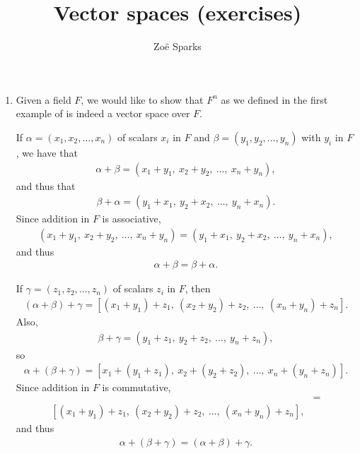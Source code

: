\documentclass[12pt]{article}
\title{Vector spaces (exercises)}
\author{Zoë Sparks}
\begin{document}
\theoremstyle{definition}

\newtheorem{thm}{Theorem}
\newtheorem*{nthm}{Theorem}
\newtheorem{sthm}{}[thm]
\newtheorem{lemma}{Lemma}[thm]
\newtheorem*{nlemma}{Lemma}
\newtheorem{cor}{Corollary}[thm]
\newtheorem*{prop}{Property}
\newtheorem*{defn}{Definition}
\newtheorem*{comm}{Comment}
\newtheorem*{exm}{Example}

\maketitle

\begin{enumerate}
  \item
    Given a field $F$, we would like to show that $F^n$ as we
    defined in the first example of  is indeed
    a vector space over $F$.

    If $\alpha = (x_1,x_2,\ldots,x_n)$ of scalars $x_i$ in $F$
    and $\beta = (y_1,y_2,\ldots,y_n)$ with $y_i$ in $F$, we have
    that
    \begin{align*}
      \alpha + \beta = (x_1+y_1,\ x_2+y_2,\ \ldots,\ x_n+y_n),
    \end{align*}
    and thus that
    \begin{align*}
      \beta + \alpha = (y_1+x_1,\ y_2+x_2,\ \ldots,\ y_n+x_n).
    \end{align*}
    Since addition in $F$ is associative,
    \begin{align*}
      (x_1+y_1,\ x_2+y_2,\ \ldots,\ x_n+y_n) = (y_1+x_1,\
      y_2+x_2,\ \ldots,\ y_n+x_n),
    \end{align*}
    and thus
    \begin{align*}
      \alpha + \beta = \beta + \alpha.
    \end{align*}

    If $\gamma = (z_1,z_2,\ldots,z_n)$ of scalars $z_i$ in $F$,
    then
    \begin{align*}
      (\alpha + \beta) + \gamma = [(x_1+y_1)+z_1,\
      (x_2+y_2)+z_2,\ \ldots,\ (x_n+y_n)+z_n].
    \end{align*}
    Also,
    \begin{align*}
      \beta + \gamma = (y_1+z_1,\ y_2+z_2,\ \ldots,\ y_n+z_n),
    \end{align*}
    so
    \begin{align*}
      \alpha + (\beta + \gamma) = [x_1+(y_1+z_1),\
      x_2+(y_2+z_2),\ \ldots,\ x_n+(y_n+z_n)].
    \end{align*}
    Since addition in $F$ is commutative,
    \begin{align*}
      [x_1+(y_1+z_1),\ x_2+(y_2+z_2),\ \ldots,\ x_n+(y_n+z_n)]
      &=\\
      [(x_1+y_1)+z_1,\ (x_2+y_2)+z_2,\ \ldots,\ (x_n+y_n)+z_n],
    \end{align*}
    and thus
    \begin{align*}
      \alpha + (\beta + \gamma) = (\alpha + \beta) + \gamma.
    \end{align*}


\end{enumerate}
\end{document}
